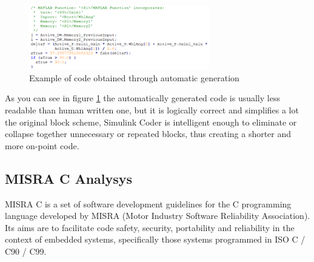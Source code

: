 \begin{figure} \label{Codegen Snippet}
		\centering
		\includegraphics[width=0.7\textwidth]{Images/Simulator/codegen-snippet}
		\caption{Example of code obtained through automatic generation}	
\end{figure}
As you can see in figure \ref{Codegen Snippet} the automatically generated code is usually less readable than human written one, but it is logically correct and simplifies a lot the original block scheme, Simulink Coder is intelligent enough to eliminate or collapse together unnecessary or repeated blocks, thus creating a shorter and more on-point code.
\newpage
\subsection{MISRA C Analysys}

MISRA C is a set of software development guidelines for the C programming language developed by MISRA (Motor Industry Software Reliability Association). Its aims are to facilitate code safety, security, portability and reliability in the context of embedded systems, specifically those systems programmed in ISO C / C90 / C99.

